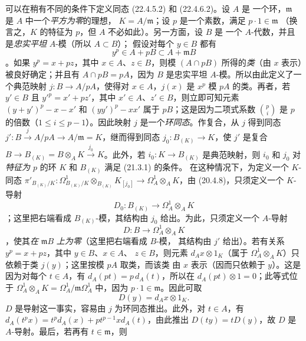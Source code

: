 \begin{remark}[22.4.8]
\label{0.22.4.8-fr}
可以在稍有不同的条件下定义同态 (22.4.5.2) 和 (22.4.6.2)。设 $A$ 是
一个环，$\mathfrak m$ 是 $A$ 中一个\emph{平方为零}的理想，
$K=A/\mathfrak m$；设 $p$ 是一个素数，满足 $p\cdot1\in\mathfrak m$
（换言之，$K$ 的特征为 $p$，但 $A$ 不必如此）。另一方面，设 $B$ 是
一个 $A$-代数，并且是\emph{忠实平坦} $A$-模（所以 $A\subset B$）；
假设对每个 $y\in B$ 都有
\begin{equation}
\label{0.22.4.8.1-fr}
  y^p\in A+pB\subset A+\mathfrak mB
  \tag{22.4.8.1}
\end{equation}
。如果 $y^p=x+pz$，其中 $x\in A$、$z\in B$，则模
$(A\cap pB)$ 所得的\emph{类}（由 $x$ 表示）被良好确定；并且有
$A\cap pB=pA$，因为 $B$ 是忠实平坦 $A$-模。所以由此定义了一个典范映射
$j:B\longrightarrow A/pA$，使得对 $x\in A$，$j(x)$ 是 $x^p$ 模
$pA$ 的类。再者，若 $y'\in B$ 且
$y'^p=x'+pz'$，其中 $x'\in A$、$z'\in B$，则立即可知元素
$(y+y')^p-x-x'$ 和 $(yy')^p-xx'$ 属于 $pB$；这是因为二项式系数
$\binom pi$ 是 $p$ 的倍数（$1\leqslant i\leqslant p-1$）。因此映射
$j$ 是一个\emph{环同态}。作复合，从 $j$ 得到同态
$j':B\xrightarrow{j}A/pA\longrightarrow A/\mathfrak m=K$，继而得到同态
$j_0:B_{(K)}\longrightarrow K$，使 $j'$ 是复合
$B\longrightarrow B_{(K)}=B\otimes_AK\xrightarrow{j_0}K$。此外，若
$i_0:K\longrightarrow B_{(K)}$ 是典范映射，则 $i_0$ 和 $j_0$ 对
\emph{特征为 $p$} 的环 $K$ 和 $B_{(K)}$ 满足 (21.3.1) 的条件。
在这种情况下，为定义一个 $K$-同态
$\pi'_{B_{(K)}/K}:\Omega^1_{B_{(K)}/K}\otimes_{B_{(K)}}K_{[j_0]}
\longrightarrow\Omega^1_A\otimes_AK$，由 (20.4.8)，只须定义一个
$K$-导射
\begin{equation}
\label{0.22.4.8.2-fr}
  D_0:B_{(K)}\longrightarrow\Omega^1_A\otimes_AK
  \tag{22.4.8.2}
\end{equation}
；这里把右端看成 $B_{(K)}$-模，其结构由 $j_0$ 给出。为此，只须定义一个
$A$-导射
\begin{equation}
\label{0.22.4.8.3-fr}
  D:B\longrightarrow\Omega^1_A\otimes_AK
  \tag{22.4.8.3}
\end{equation}
，使其\emph{在} $\mathfrak mB$ \emph{上为零}（这里把右端看成 $B$-模，
其结构由 $j'$ 给出）。若有关系 $y^p=x+pz$，其中 $y\in B$、$x\in A$、
$z\in B$，则元素 $d_Ax\otimes1_K$（属于
$\Omega^1_A\otimes_AK$）只依赖于类 $j(y)$；这里按模 $pA$ 取类，而该类
由 $x$ 表示（因而只依赖于 $y$）。这是因为对每个 $t\in A$，有
$d_A(pt)=p\,d_A(t)$，所以在
$d_A(pt)\otimes1=0$；此等式位于
$\Omega^1_A\otimes_AK=\Omega^1_A/\mathfrak m\Omega^1_A$ 中，因为
$p\cdot1\in\mathfrak m$。因此可取
\[
  D(y)=d_Ax\otimes1_K.
\]
$D$ 是导射这一事实，容易由 $j$ 为环同态推出。此外，对 $t\in A$，有
$d_A(t^px)=t^p d_A(x)+pt^{p-1}x d_A(t)$，由此推出
$D(ty)=tD(y)$，故 $D$ 是 $A$-导射。最后，若再有
$t\in\mathfrak m$，则


\end{remark}
